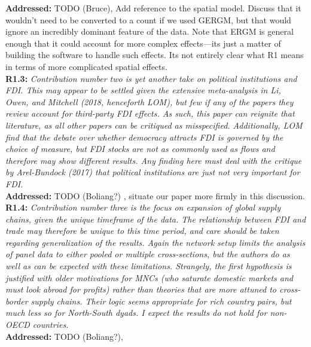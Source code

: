 \documentclass[a4paper,11pt]{texMemo}
\begin{document}
\noindent \textbf{Addressed:} TODO  (Bruce), Add reference to the spatial model. Discuss that it wouldn't need to be converted to a count if we used GERGM, but that would ignore an incredibly dominant feature of the data. Note that ERGM is general enough that it could account for more complex effects---its just a matter of building the software to handle such effects. Its not entirely clear what  R1 means in terms of more complicated spatial effects.  \\


\noindent \textbf{R1.3:} \emph{Contribution number two is yet another take on political institutions and FDI. This may appear to be settled given the extensive meta-analysis in Li, Owen, and Mitchell (2018, henceforth LOM), but few if any of the papers they review account for third-party FDI effects. As such, this paper can reignite that literature, as all other papers can be critiqued as misspecified. Additionally, LOM find that the debate over whether democracy attracts FDI is governed by the choice of measure, but FDI stocks are not as commonly used as flows and therefore may show different results. Any finding here must deal with the critique by Arel-Bundock (2017) that political institutions are just not very important for FDI.}\\

\noindent \textbf{Addressed:} TODO (Boliang?) , situate our paper more firmly in this discussion. \\


\noindent \textbf{R1.4:} \emph{Contribution number three is the focus on expansion of global supply chains, given the unique timeframe of the data. The relationship between FDI and trade may therefore be unique to this time period, and care should be taken regarding generalization of the results. Again the network setup limits the analysis of panel data to either pooled or multiple cross-sections, but the authors do as well as can be expected with these limitations. Strangely, the first hypothesis is justified with older motivations for MNCs (who saturate domestic markets and must look abroad for profits) rather than theories that are more attuned to cross-border supply chains. Their logic seems appropriate for rich country pairs, but much less so for North-South dyads. I expect the results do not hold for non-OECD countries.}\\

\noindent \textbf{Addressed:} TODO (Boliang?),  \\
\end{document}

